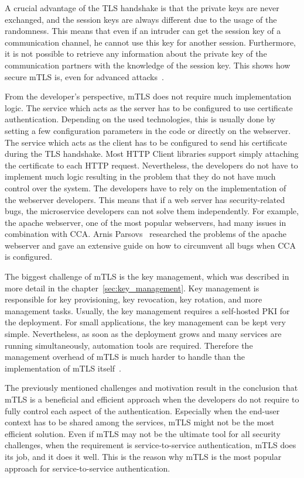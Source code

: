 A crucial advantage of the TLS handshake is that the private keys are never exchanged, and the session keys are always different due to the usage of the randomness.
This means that even if an intruder can get the session key of a communication channel, he cannot use this key for another session.
Furthermore, it is not possible to retrieve any information about the private key of the communication partners with the knowledge of the session key.
This shows how secure mTLS is, even for advanced attacks~\cite{parsovs2013practical}.

From the developer's perspective, mTLS does not require much implementation logic.
The service which acts as the server has to be configured to use certificate authentication.
Depending on the used technologies, this is usually done by setting a few configuration parameters in the code or directly on the webserver.
The service which acts as the client has to be configured to send his certificate during the TLS handshake.
Most HTTP Client libraries support simply attaching the certificate to each HTTP request.
Nevertheless, the developers do not have to implement much logic resulting in the problem that they do not have much control over the system.
The developers have to rely on the implementation of the webserver developers.
This means that if a web server has security-related bugs, the microservice developers can not solve them independently.
For example, the apache webserver, one of the most popular webservers, had many issues in combination with CCA.
Arnis Parsovs~\cite{parsovs2013practical} researched the problems of the apache webserver and gave an extensive guide on how to circumvent all bugs when CCA is configured.

The biggest challenge of mTLS is the key management, which was described in more detail in the chapter~\ref{sec:key_management}.
Key management is responsible for key provisioning, key revocation, key rotation, and more management tasks.
Usually, the key management requires a self-hosted PKI for the deployment.
For small applications, the key management can be kept very simple.
Nevertheless, as soon as the deployment grows and many services are running simultaneously, automation tools are required.
Therefore the management overhead of mTLS is much harder to handle than the implementation of mTLS itself~\cite{dias2020microservices}.

The previously mentioned challenges and motivation result in the conclusion that mTLS is a beneficial and efficient approach when the developers do not require to fully control each aspect of the authentication.
Especially when the end-user context has to be shared among the services, mTLS might not be the most efficient solution.
Even if mTLS may not be the ultimate tool for all security challenges, when the requirement is service-to-service authentication, mTLS does its job, and it does it well.
This is the reason why mTLS is the most popular approach for service-to-service authentication.

